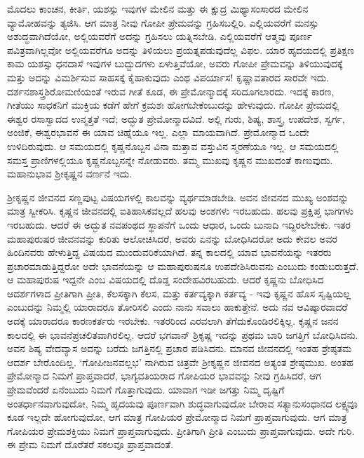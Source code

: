 ಮೊದಲು ಕಾಂಚನ, ಕೀರ್ತಿ, ಯಶಸ್ಸು ಇವುಗಳ ಮೇಲಿನ ಮತ್ತು ಈ ಕ್ಷುದ್ರ ಮಿಥ್ಯಾಸಂಸಾರದ ಮೇಲಿನ ವ್ಯಾಮೋಹವನ್ನು ತ್ಯಜಿಸಿ. ಆಗ ಮಾತ್ರ ನೀವು ಗೋಪೀ ಪ್ರೇಮವನ್ನು ಗ್ರಹಿಸಬಲ್ಲಿರಿ. ಎಲ್ಲಿಯವರೆಗೆ ಮನಸ್ಸು ಅಶುದ್ಧವಾಗಿದೆಯೋ, ಅಲ್ಲಿಯವರೆಗೆ ಅದನ್ನು ಗ್ರಹಿಸಲು ಯತ್ನಿಸಬೇಡಿ. ಎಲ್ಲಿಯವರೆಗೆ ಆತ್ಮವು ಪೂರ್ಣ ಪವಿತ್ರವಾಗಿಲ್ಲವೋ ಅಲ್ಲಿಯವರೆಗೂ ಅದನ್ನು ತಿಳಿಯಲು ಪ್ರಯತ್ನಪಡುವುದೆಲ್ಲ ವಿಫಲ. ಯಾರ ಹೃದಯದಲ್ಲಿ ಪ್ರತಿಕ್ಷಣ ಕಾಮ ಯಶಸ್ಸು ಧನದಾಸೆ ಇವುಗಳ ಬುದ್ಬುದಗಳು ಏಳುತ್ತಿವೆಯೋ, ಅವರು ಗೋಪೀ ಪ್ರೇಮವನ್ನು ತಿಳಿಯುವುದಕ್ಕೆ ಮತ್ತು ಅದನ್ನು ವಿಮರ್ಶಿಸುವ ಸಾಹಸಕ್ಕೆ ಕೈಹಾಕುವುದು ಎಂಥ ವಿಪರ್ಯಾಸ! ಕೃಷ್ಣಾವತಾರದ ಸಾರವೇ ಇದು. ದರ್ಶನಶಾಸ್ತ್ರಶಿರೋಮಣಿಯಂತೆ ಇರುವ ಗೀತೆ ಕೂಡ, ಈ ಪ್ರೇಮೋನ್ಮಾದಕ್ಕೆ ಸರಿದೂಗಲಾರದು. ಇದಕ್ಕೆ ಕಾರಣ, ಗೀತೆಯು ಸಾಧಕನಿಗೆ ಮುಕ್ತಿಯ ಕಡೆಗೆ ಹೇಗೆ ಕ್ರಮಶಃ ಹೋಗಬೇಕೆಂಬುದನ್ನು ಹೇಳುವುದು. ಗೋಪೀ ಪ್ರೇಮದಲ್ಲಿ ಈಶ್ವರ ರಸಾಸ್ವಾದದ ಉನ್ಮತ್ತತೆ ಇದೆ; ಅದ್ಭುತ ಪ್ರೇಮೋನ್ಮಾದವಿದೆ. ಅಲ್ಲಿ ಗುರು, ಶಿಷ್ಯ, ಶಾಸ್ತ್ರ, ಉಪದೇಶ, ಸ್ವರ್ಗ, ಅಂಜಿಕೆ, ಈಶ್ವರಭಾವನೆ ಈ ಯಾವ ಚಿಹ್ನೆಯೂ ಇಲ್ಲ. ಎಲ್ಲಾ ಮಾಯವಾಗಿದೆ. ಪ್ರೇಮೋನ್ಮಾದ ಒಂದೇ ಉಳಿದಿರುವುದು. ಆ ಸಮಯದಲ್ಲಿ ಕೃಷ್ಣನೊಬ್ಬನ ವಿನಾ ಮತ್ತಾವ ವಸ್ತುವಿನ ಸ್ಮರಣೆಯೂ ಇಲ್ಲ. ಆ ಸಮಯದಲ್ಲಿ ಸಮಸ್ತ ಪ್ರಾಣಿಗಳಲ್ಲಿಯೂ ಕೃಷ್ಣನೊಬ್ಬನನ್ನೇ ನೋಡುವರು. ತಮ್ಮ ಮುಖವು ಕೃಷ್ಣನ ಮುಖದಂತೆ ಕಾಣುವುದು. ಮಹಾನುಭಾವ ಶ‍್ರೀಕೃಷ್ಣನ ವರ್ಣನೆ ಇದು.

ಶ‍್ರೀಕೃಷ್ಣನ ಜೀವನದ ಸಣ್ಣಪುಟ್ಟ ವಿಷಯಗಳಲ್ಲಿ ಕಾಲವನ್ನು ವ್ಯರ್ಥಮಾಡಬೇಡಿ. ಅವನ ಜೀವನದ ಮುಖ್ಯ ಅಂಶವನ್ನು ಮಾತ್ರ ಸ್ವೀಕರಿಸಿ. ಕೃಷ್ಣನ ಜೀವನದಲ್ಲಿ ಐತಿಹಾಸಿಕವಲ್ಲದೆ ಹಲವು ಅಂಶಗಳು ಇರಬಹುದು. ಹಲವು ಪ್ರಕ್ಷಿಪ್ತ ಭಾಗಗಳು ಇರಬಹುದು. ಆದರೆ ಈ ಅದ್ಭುತ ನವಪಂಥದ ಸ್ಥಾಪನೆಗೆ ಒಂದು ಆಧಾರ, ಒಂದು ಬುನಾದಿ ಇದ್ದಿರಲೇಬೇಕು. ಇತರ ಮಹಾಪುರುಷರ ಜೀವನವನ್ನು ಕುರಿತು ಆಲೋಚಿಸಿದರೆ, ಅವರು ಏನನ್ನು ಬೋಧಿಸಿದರೋ ಅದು ಕೇವಲ ಅವರ ಹಿಂದಿನವರು ಹೇಳುತ್ತಿದ್ದ ವಿಷಯದ ಮುಂದುವರಿಕೆಯಾಗಿದೆ. ತನ್ನ ಕಾಲದಲ್ಲಿ ಯಾವ ಭಾವನೆಯನ್ನು ಇತರರು ಪ್ರಚಾರಮಾಡುತ್ತಿದ್ದರೋ ಅದೇ ಭಾವನೆಯನ್ನು ಆ ಮಹಾಪುರುಷನೂ ಉಪದೇಶಿಸಿರುವನು ಎಂಬುದು ಕಂಡುಬರುತ್ತದೆ. ಆ ಮಹಾಪುರುಷ ಇದ್ದನೇ ಎಂಬ ವಿಷಯದಲ್ಲಿ ದೊಡ್ಡ ಸಂದೇಹವಿರಬಹುದು. ಆದರೆ ಕೃಷ್ಣನು ಬೋಧಿಸಿದ ಆದರ್ಶಗಳಾದ ಪ್ರೀತಿಗಾಗಿ ಪ್ರೀತಿ, ಕೆಲಸಕ್ಕಾಗಿ ಕೆಲಸ, ಮತ್ತು ಕರ್ತವ್ಯಕ್ಕಾಗಿ ಕರ್ತವ್ಯ - ಇವು ಕೃಷ್ಣನ ಹೊಸ ಸೃಷ್ಟಿಯಲ್ಲ ಎಂಬುದನ್ನು ನಿಮ್ಮಲ್ಲಿ ಯಾರಾದರೂ ತೋರಿಸಲಿ ಎಂದು ನಾನು ಸವಾಲು ಹಾಕುತ್ತೇನೆ. ಅದು ನವ ಆವಿಷ್ಕಾರವಾದರೆ ಅದಕ್ಕೆ ಯಾರಾದರೂ ಕಾರಣಕರ್ತರು ಇರಬೇಕು. ಇತರರಿಂದ ಎರವಲಾಗಿ ತೆಗೆದುಕೊಂಡಿರಲಿಕ್ಕಿಲ್ಲ. ಕೃಷ್ಣನ ಜನನ ಕಾಲದಲ್ಲಿ ಈ ಭಾವನೆಪ್ರಚಲಿತವಾಗಿರಲಿಲ್ಲ. ಆದರೆ ಭಗವಾನ್​ ಶ್ರಿಕೃಷ್ಣ ಇದನ್ನು ಪ್ರಥಮ ಬಾರಿ ಜಗತ್ತಿಗೆ ಬೋಧಿಸಿದನು. ಅವನ ಶಿಷ್ಯ ವೇದವ್ಯಾಸ ಅದನ್ನು ಬರೆದು ಜಗತ್ತಿನಲ್ಲಿ ಪ್ರಚಾರ ಪಡಿಸಿದನು. ಮಾನವ ಜೀವನದಲ್ಲಿ ಇಂತಹ ಶ್ರೇಷ್ಠತಮ ಆದರ್ಶ ಬೇರೊಂದಿಲ್ಲ. ‘ಗೋಪೀಜನವಲ್ಲಭ’ ನಾಗಿರುವ ಚಿತ್ರವೇ ಶ‍್ರೀಕೃಷ್ಣನ ಜೀವನದ ಅತ್ಯಂತ ಶ್ರೇಷ್ಠಮುಖ. ಅಂತಹ ಪ್ರೇಮೋನ್ಮಾದ ನಿಮಗೆ ಪ್ರಾಪ್ತವಾದರೆ, ಭಾಗ್ಯವತಿಯರಾದ ಗೋಪಿಯರ ಭಾವವನ್ನು ನೀವು ಗ್ರಹಿಸಿದರೆ, ಆಗ ಪ್ರೇಮವೆಂದರೆ ಏನೆಂಬುದು ನಿಮಗೆ ಗೊತ್ತಾಗುವುದು. ಯಾವಾಗ ಇಡೀ ಜಗತ್ತು ನಿಮ್ಮ ದೃಷ್ಟಿಗೆ ಅಂತರ್ಧಾನವಾಗುವುದೋ, ನಿಮ್ಮ ಹೃದಯವು ಪೂರ್ಣವಾಗಿ ಶುದ್ಧವಾಗುವುದೋ ಬೇರಾವ ಸತ್ಯಾನುಸಂಧಾನದ ಲಕ್ಷ್ಯವೂ ಕೂಡ ಇಲ್ಲದೇ ಹೋಗುವುದೋ, ಆಗ ಮಾತ್ರ ಗೋಪಿಯರ ಪ್ರೇಮೋನ್ಮಾದ ನಿಮಗೆ ಪ್ರಾಪ್ತವಾಗುವುದು. ಆಗ ಮಾತ್ರ ಗೋಪಿಯರ ಪ್ರೇಮಶಕ್ತಿಯು ನಿಮಗೆ ಪ್ರಾಪ್ತವಾಗುವುದು. ಪ್ರೀತಿಗಾಗಿ ಪ್ರೀತಿ ಎಂಬುದು ಪ್ರಾಪ್ತವಾಗುವುದು. ಅದೇ ಗುರಿ. ಈ ಪ್ರೇಮ ನಿಮಗೆ ದೊರೆತರೆ ಸಕಲವೂ ಪ್ರಾಪ್ತವಾದಂತೆ.

